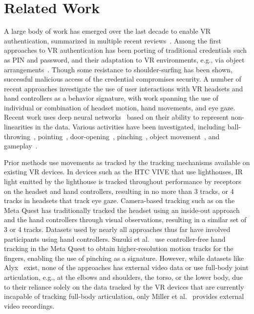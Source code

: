 \section{Related Work}
A large body of work has emerged over the last decade to enable VR authentication, summarized in multiple recent reviews~\cite{giaretta2022security,stephenson2022sok,odeleye2023virtually}. Among the first approaches to VR authentication has been porting of traditional credentials such as PIN and password, and their adaptation to VR environments, e.g., via object arrangements~\cite{george2019investigating,george2020gazeroomlock}. Though some resistance to shoulder-surfing has been shown, successful malicious access of the credential compromises security. A number of recent approaches investigate the use of user interactions with VR headsets and hand controllers as a behavior signature, with work spanning the use of individual or combination of headset motion, hand movements, and eye gaze. Recent work uses deep neural networks~\cite{mathis2020knowledge,miller2021using,miller2022combining,liebers2021using,liebers2021understanding,li2024evaluating,li2024using,liebers2024kinetic} based on their ability to represent non-linearities in the data. Various activities have been investigated, including ball-throwing~\cite{miller2022combining}, pointing~\cite{pfeuffer2019behavioural}, door-opening~\cite{li2024evaluating}, pinching~\cite{suzuki2023pinchkey}, object movement~\cite{mathis2020knowledge}, and gameplay~\cite{liebers2023exploring}. 

Prior methods use movements as tracked by the tracking mechanisms available on existing VR devices. In devices such as the HTC VIVE that use lighthouses, IR light emitted by the lighthouse is tracked throughout performance by receptors on the headset and hand controllers, resulting in no more than 3 tracks, or 4 tracks in headsets that track eye gaze. Camera-based tracking such as on the Meta Quest has traditionally tracked the headset using an inside-out approach and the hand controllers through visual observations, resulting in a similar set of 3 or 4 tracks. Datasets used by nearly all approaches thus far have involved participants using hand controllers. Suzuki et al.~\cite{suzuki2023pinchkey} use controller-free hand tracking in the Meta Quest to obtain higher-resolution motion tracks for the fingers, enabling the use of pinching as a signature. However, while datasets like Alyx~\cite{rack2023alyx} exist, none of the approaches has external video data or use full-body joint articulation, e.g., at the elbows and shoulders, the torso, or the lower body, due to their reliance solely on the data tracked by the VR devices that are currently incapable of tracking full-body articulation, only Miller et al.~\cite{miller2022combining} provides external video recordings.

